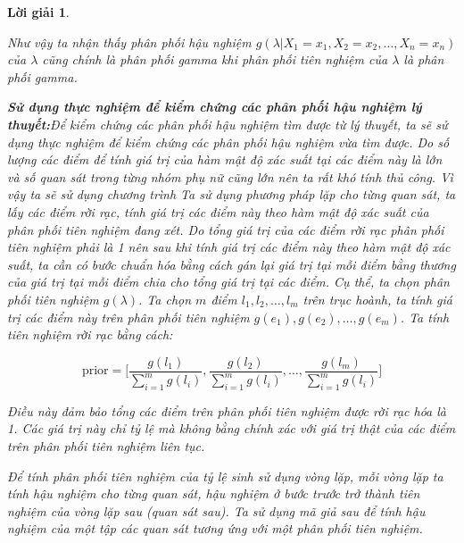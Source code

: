\documentclass[14pt, a4paper]{article}
\theoremstyle{sltheorem}
\theoremstyle{soltheorem}
\newtheorem*{loigiai}{Lời giải}
\begin{document}
\begin{loigiai}
\begin{enumerate}
\begin{enumerate}[label=(\alph*)]
            Như vậy ta nhận thấy phân phối hậu nghiệm $g(\lambda \vert X_1 =x_1, X_2=x_2, \dots, X_n=x_n)$ của $\lambda$ cũng chính là phân phối gamma khi phân phối tiên nghiệm của $\lambda$ là phân phối gamma.
        \end{enumerate}

        \textbf{Sử dụng thực nghiệm để kiểm chứng các phân phối hậu nghiệm lý thuyết:}Để kiểm chứng các phân phối hậu nghiệm tìm được từ lý thuyết, ta sẽ sử dụng thực nghiệm để kiểm chứng các phân phối hậu nghiệm vừa tìm được.
        Do số lượng các điểm để tính giá trị của hàm mật độ xác suất tại các điểm này là lớn và số quan sát trong từng nhóm phụ nữ cũng lớn nên ta rất khó tính thủ công.
        Vì vậy ta sẽ sử dụng chương trình
        Ta sử dụng phương pháp lặp cho từng quan sát, ta lấy các điểm rời rạc, tính giá trị các điểm này theo hàm mật độ xác suất của phân phối tiên nghiệm đang xét.
        Do tổng giá trị của các điểm rời rạc phân phối tiên nghiệm phải là 1 nên sau khi tính giá trị các điểm này theo hàm mật độ xác suất, ta cần có bước chuẩn hóa bằng cách gán lại giá trị tại mỗi điểm bằng thương của giá trị tại mỗi điểm chia cho tổng giá trị tại các điểm.
        Cụ thể, ta chọn phân phối tiên nghiệm $g(\lambda)$.
        Ta chọn $m$ điểm $l_1, l_2, \dots, l_m$ trên trục hoành, ta tính giá trị các điểm này trên phân phối tiên nghiệm $g(e_1), g(e_2), \dots, g(e_m)$.
        Ta tính tiên nghiệm rời rạc bằng cách:

        \begin{equation*}
            \text{prior} = \Big \lbrack \dfrac{g(l_1)}{\sum_{i=1}^m g(l_i)}, \dfrac{g(l_2)}{\sum_{i=1}^m g(l_i)}, \dots, \dfrac{g(l_m)}{\sum_{i=1}^m g(l_i)} \Big \rbrack
        \end{equation*}

        Điều này đảm bảo tổng các điểm trên phân phối tiên nghiệm được rời rạc hóa là 1.
        Các giá trị này chỉ tỷ lệ mà không bằng chính xác với giá trị thật của các điểm trên phân phối tiên nghiệm liên tục.

        Để tính phân phối tiên nghiệm của tỷ lệ sinh sử dụng vòng lặp, mỗi vòng lặp ta tính hậu nghiệm cho từng quan sát, hậu nghiệm ở bước trước trở thành tiên nghiệm của vòng lặp sau (quan sát sau).
        Ta sử dụng mã giả sau để tính hậu nghiệm của một tập các quan sát tương ứng với một phân phối tiên nghiệm.



\end{enumerate}
\end{loigiai}
\end{document}
